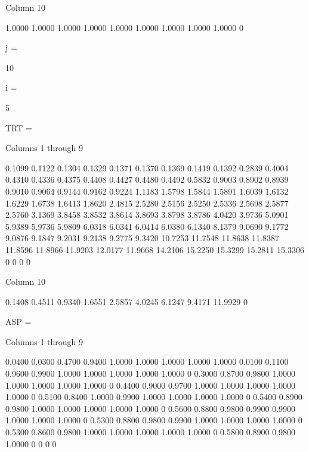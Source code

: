   Column 10

    1.0000
    1.0000
    1.0000
    1.0000
    1.0000
    1.0000
    1.0000
    1.0000
    1.0000
         0


j =

    10


i =

     5


TRT =

  Columns 1 through 9

    0.1099    0.1122    0.1304    0.1329    0.1371    0.1370    0.1369    0.1419    0.1392
    0.2839    0.4004    0.4310    0.4336    0.4375    0.4408    0.4427    0.4480    0.4492
    0.5832    0.9003    0.8902    0.8939    0.9010    0.9064    0.9144    0.9162    0.9224
    1.1183    1.5798    1.5844    1.5891    1.6039    1.6132    1.6229    1.6738    1.6413
    1.8620    2.4815    2.5280    2.5156    2.5250    2.5336    2.5698    2.5877    2.5760
    3.1369    3.8458    3.8532    3.8614    3.8693    3.8798    3.8786    4.0420    3.9736
    5.0901    5.9389    5.9736    5.9809    6.0318    6.0341    6.0414    6.0380    6.1340
    8.1379    9.0690    9.1772    9.0876    9.1847    9.2031    9.2138    9.2775    9.3420
   10.7253   11.7548   11.8638   11.8387   11.8596   11.8966   11.9203   12.0177   11.9668
   14.2106   15.2250   15.3299   15.2811   15.3306         0         0         0         0

  Column 10

    0.1408
    0.4511
    0.9340
    1.6551
    2.5857
    4.0245
    6.1247
    9.4171
   11.9929
         0


ASP =

  Columns 1 through 9

    0.0400    0.0300    0.4700    0.9400    1.0000    1.0000    1.0000    1.0000    1.0000
    0.0100    0.1100    0.9600    0.9900    1.0000    1.0000    1.0000    1.0000    1.0000
         0    0.3000    0.8700    0.9800    1.0000    1.0000    1.0000    1.0000    1.0000
         0    0.4400    0.9000    0.9700    1.0000    1.0000    1.0000    1.0000    1.0000
         0    0.5100    0.8400    1.0000    0.9900    1.0000    1.0000    1.0000    1.0000
         0    0.5400    0.8900    0.9800    1.0000    1.0000    1.0000    1.0000    1.0000
         0    0.5600    0.8800    0.9800    0.9900    0.9900    1.0000    1.0000    1.0000
         0    0.5300    0.8800    0.9800    0.9900    1.0000    1.0000    1.0000    1.0000
         0    0.5300    0.8600    0.9800    1.0000    1.0000    1.0000    1.0000    1.0000
         0    0.5800    0.8900    0.9800    1.0000         0         0         0         0

